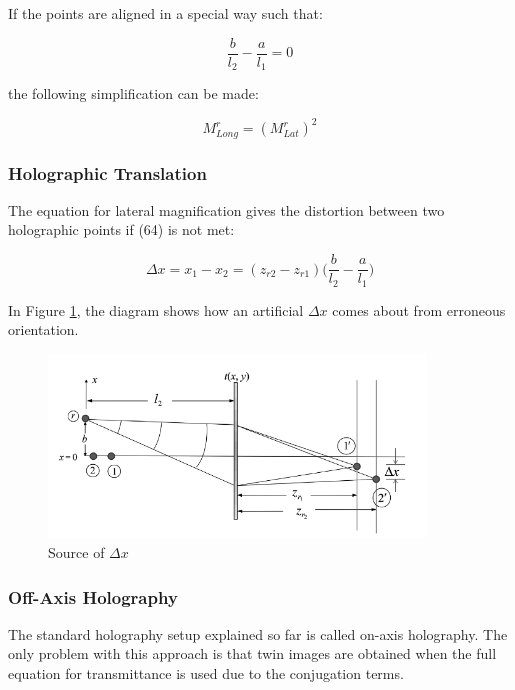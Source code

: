 \documentclass[12pt]{article}
\begin{document}
If the points are aligned in a special way such that:

\begin{equation}
	\frac{b}{l_{2}} - \frac{a}{l_{1}} = 0
\end{equation}

the following simplification can be made:

\begin{equation}
	M_{Long}^r = (M_{Lat}^r)^2
\end{equation}

\subsubsection{Holographic Translation}

The equation for lateral magnification gives the distortion between two holographic points if (64) is not met:

\begin{equation}
	\Delta x = x_{1} - x_{2} = (z_{r2} - z_{r1})\bigg(\frac{b}{l_{2}} - \frac{a}{l_{1}}\bigg)
\end{equation}

In Figure \ref{fig:deltax}, the diagram shows how an artificial \(\Delta x\) comes about from erroneous orientation.

\begin{figure}
    \centering
    \includegraphics[width=100mm]{tupac13.png}
    \caption{Source of \(\Delta x\)}
    \label{fig:deltax}
\end{figure}

\subsubsection{Off-Axis Holography}

The standard holography setup explained so far is called on-axis holography. The only problem with this approach is that twin images are obtained when the full equation for transmittance is used due to the conjugation terms.
\end{document}
